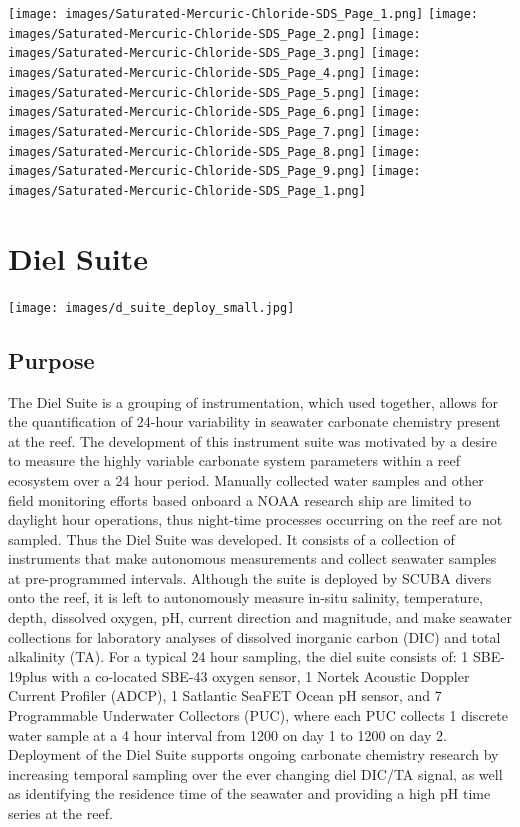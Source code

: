 \documentclass[
]{book}
\begin{document}
\texttt{[image: images/Saturated-Mercuric-Chloride-SDS\_Page\_1.png]}
\texttt{[image: images/Saturated-Mercuric-Chloride-SDS\_Page\_2.png]}
\texttt{[image: images/Saturated-Mercuric-Chloride-SDS\_Page\_3.png]}
\texttt{[image: images/Saturated-Mercuric-Chloride-SDS\_Page\_4.png]}
\texttt{[image: images/Saturated-Mercuric-Chloride-SDS\_Page\_5.png]}
\texttt{[image: images/Saturated-Mercuric-Chloride-SDS\_Page\_6.png]}
\texttt{[image: images/Saturated-Mercuric-Chloride-SDS\_Page\_7.png]}
\texttt{[image: images/Saturated-Mercuric-Chloride-SDS\_Page\_8.png]}
\texttt{[image: images/Saturated-Mercuric-Chloride-SDS\_Page\_9.png]}
\texttt{[image: images/Saturated-Mercuric-Chloride-SDS\_Page\_1.png]}

\hypertarget{dielsuite}{%
\chapter{Diel Suite}\label{dielsuite}}

\texttt{[image: images/d\_suite\_deploy\_small.jpg]}

\hypertarget{purpose}{%
\section{Purpose}\label{purpose}}

The Diel Suite is a grouping of instrumentation, which used together, allows for the quantification of 24-hour variability in seawater carbonate chemistry present at the reef. The development of this instrument suite was motivated by a desire to measure the highly variable carbonate system parameters within a reef ecosystem over a 24 hour period. Manually collected water samples and other field monitoring efforts based onboard a NOAA research ship are limited to daylight hour operations, thus night-time processes occurring on the reef are not sampled. Thus the Diel Suite was developed. It consists of a collection of instruments that make autonomous measurements and collect seawater samples at pre-programmed intervals. Although the suite is deployed by SCUBA divers onto the reef, it is left to autonomously measure in-situ salinity, temperature, depth, dissolved oxygen, pH, current direction and magnitude, and make seawater collections for laboratory analyses of dissolved inorganic carbon (DIC) and total alkalinity (TA). For a typical 24 hour sampling, the diel suite consists of: 1 SBE-19plus with a co-located SBE-43 oxygen sensor, 1 Nortek Acoustic Doppler Current Profiler (ADCP), 1 Satlantic SeaFET Ocean pH sensor, and 7 Programmable Underwater Collectors (PUC), where each PUC collects 1 discrete water sample at a 4 hour interval from 1200 on day 1 to 1200 on day 2. Deployment of the Diel Suite supports ongoing carbonate chemistry research by increasing temporal sampling over the ever changing diel DIC/TA signal, as well as identifying the residence time of the seawater and providing a high pH time series at the reef.
\end{document}
